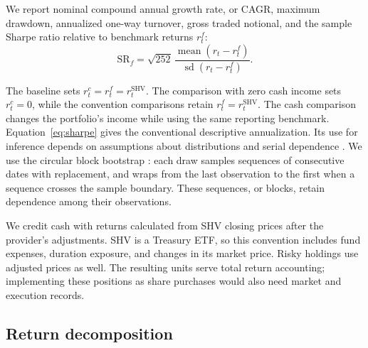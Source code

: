 \documentclass{article}
\begin{document}
\begin{samepage}
We report nominal compound annual growth rate, or CAGR, maximum drawdown, annualized one-way turnover, gross
traded notional, and the sample Sharpe ratio relative to benchmark returns $r^f_t$:
\begin{equation}
  \mathrm{SR}_f = \sqrt{252}\,
  \frac{\operatorname{mean}(r_t-r^f_t)}
       {\operatorname{sd}(r_t-r^f_t)}.
  \label{eq:sharpe}
\end{equation}
\end{samepage}
The baseline sets $r^c_t=r^f_t=r^{\mathrm{SHV}}_t$. The comparison with zero cash income
sets $r^c_t=0$, while the convention comparisons retain
$r^f_t=r^{\mathrm{SHV}}_t$. The cash comparison changes the portfolio's income while using the same reporting benchmark. Equation~\ref{eq:sharpe} gives the conventional descriptive annualization. Its use for inference depends on assumptions about distributions and serial dependence \citep{lo2002statistics}. We use the circular block bootstrap \citep{politis1992circular}: each draw samples sequences of consecutive dates with replacement, and wraps from the last observation to the first when a sequence crosses the sample boundary. These sequences, or blocks, retain dependence among their observations.

We credit cash with returns calculated from SHV closing prices after the provider's adjustments. SHV is a Treasury ETF, so this convention includes fund expenses, duration exposure, and changes in its market price. Risky holdings use adjusted prices as well. The resulting units serve total return accounting; implementing these positions as share purchases would also need market and execution records.

\subsection{Return decomposition}
\end{document}
